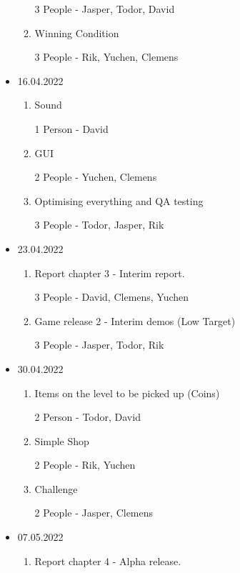 \begin{itemize}
\begin{enumerate}
        3 People - Jasper, Todor, David
        \item Winning Condition
        
        3 People - Rik, Yuchen, Clemens
    \end{enumerate}
    
    \item 16.04.2022
    \begin{enumerate}
        \item Sound
        
        1 Person - David
        \item GUI
        
        2 People - Yuchen, Clemens
        \item Optimising everything and QA testing
        
        3 People - Todor, Jasper, Rik
    \end{enumerate}
    
    \item 23.04.2022
    \begin{enumerate}
        \item Report chapter 3 - Interim report.
        
        3 People - David, Clemens, Yuchen
        \item Game release 2 - Interim demos (Low Target)
        
        3 People - Jasper, Todor, Rik
    \end{enumerate}
    
    \item 30.04.2022
    \begin{enumerate}
        \item Items on the level to be picked up (Coins)
        
        2 Person - Todor, David
        
        \item Simple Shop
        
        2 People - Rik, Yuchen
        
        \item Challenge
        
        2 People - Jasper, Clemens
    \end{enumerate}
    
    \item 07.05.2022
    \begin{enumerate}
        \item Report chapter 4 - Alpha release.
        

\end{enumerate}
\end{itemize}
